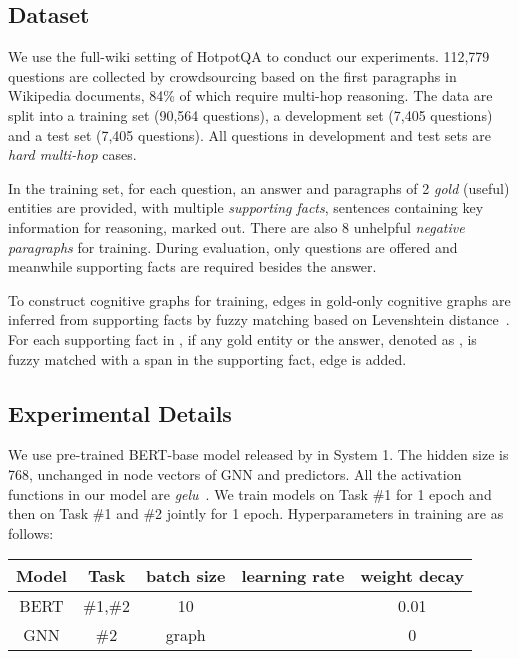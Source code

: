 \subsection{Dataset}\label{sec:dataset}
We use the full-wiki setting of HotpotQA to conduct our experiments. 
112,779 questions are collected by crowdsourcing based on the first paragraphs in Wikipedia documents, 84\% of which require multi-hop reasoning. The data are split into a training set (90,564 questions), a development set (7,405 questions) and 
a test set (7,405 questions).
All questions in development and test sets are \textit{hard multi-hop} cases.

In the training set, for each question, an answer and paragraphs of 2 \textit{gold} (useful) entities are provided, with multiple \textit{supporting facts}, sentences containing key information for reasoning, marked out. There are also 8 unhelpful \textit{negative paragraphs} for training. During evaluation, only questions are offered and meanwhile supporting facts are required besides the answer.  

To construct cognitive graphs for training, edges in gold-only cognitive graphs are inferred from supporting facts by fuzzy matching based on Levenshtein distance~\cite{navarro2001guided}.\label{fuzzy_match}
For each supporting fact in , if any gold entity or the answer, denoted as , is fuzzy matched with a span in the supporting fact, edge  is added.

\subsection{Experimental Details}
We use pre-trained BERT-base model released by \cite{devlin2018bert} in System 1. The hidden size  is 768, unchanged in node vectors of GNN and predictors. All the activation functions in our model are \emph{gelu}~\cite{hendrycks2016bridging}. We train models on Task \#1 for 1 epoch and then on Task \#1 and \#2 jointly for 1 epoch. Hyperparameters in training are as follows: 
\begin{center}
\begin{small}
\setlength{\tabcolsep}{3pt}
\begin{tabular}{ccccc}
\hline
    Model&Task&batch size&learning rate&weight decay\\
    \hline
    BERT & \#1,\#2 & 10 &  & 0.01\\
    GNN & \#2 & graph &  & 0 \\
\hline
\end{tabular}
\end{small}
\end{center}

